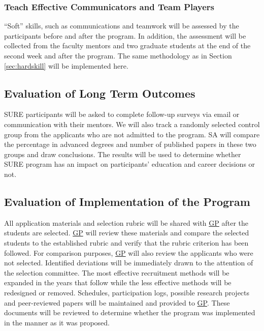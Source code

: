 \documentclass[11pt]{NSFamsart}
\newcommand{\GP}{\hyperlink{GPlink}{GP}\xspace}
\begin{document}
\subsubsection{Teach Effective Communicators and Team Players}

``Soft'' skills, such as communications and teamwork will be assessed by the participants before and after the program. In addition, the assessment will be collected from the faculty mentors and two graduate students at the end of the second week and after the program. The same methodology as in Section \ref{sec:hardskill} will be implemented here. 


\subsection{Evaluation of Long Term Outcomes}

SURE participants will be
asked to complete follow-up surveys via email or communication with their mentors. We will also track a randomly selected control group from the applicants who are not admitted to the program. SA will compare the percentage in advanced degrees and number of published papers in these two groups and draw conclusions. The results will be used to determine whether SURE program has an impact on participants' education and career decisions or not.


\subsection{Evaluation of Implementation of the Program}
 All application materials and selection rubric will be shared
with \GP after the students are selected. \GP will review
these materials and  compare the selected students to the established
rubric and verify that the rubric criterion has been followed. For comparison purposes, \GP will also
review the applicants who were not selected. Identified deviations will be immediately drawn to the
attention of the selection committee. The most effective recruitment methods will be expanded in the
years that follow while the less effective methods will be redesigned or removed. Schedules, participation logs, possible research projects and peer-reviewed papers will be maintained and provided to \GP. These documents will be reviewed to determine whether the program was implemented in the manner
as it was proposed.
 
\end{document}
